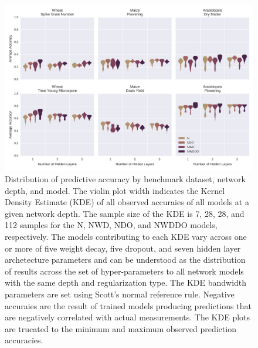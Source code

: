 
\begin{figure}[htbp]
\renewcommand{\familydefault}{\sfdefault}\normalfont
\centering 
\includegraphics[keepaspectratio,height=\textheight,width=\linewidth]{g3_article/figures/depth_comparison.png}
    \caption{Distribution of predictive accuracy by benchmark dataset, network depth, 
             and model. The violin plot width indicates the Kernel Density Estimate 
             (KDE) of all observed accuraies of all models at a given network depth. 
             The sample size of the KDE is 7, 28, 28, and 112 samples for the 
             N, NWD, NDO, and NWDDO models, respectively. The models contributing 
             to each KDE vary across one or more of five weight decay, five dropout, 
             and seven hidden layer archetecture parameters and can be 
             understood as the distribution of results across the set of 
             hyper-parameters to all network models with the same depth and regularization
             type. The KDE bandwidth parameters are set using Scott's normal reference rule. 
             Negative accuraies are the result of trained models producing predictions that 
             are negatively correlated with actual measurements. The KDE plots are 
             trucated to the minimum and maximum observed prediction accuracies.} 
\label{fig:depth-comparison}
\end{figure}

